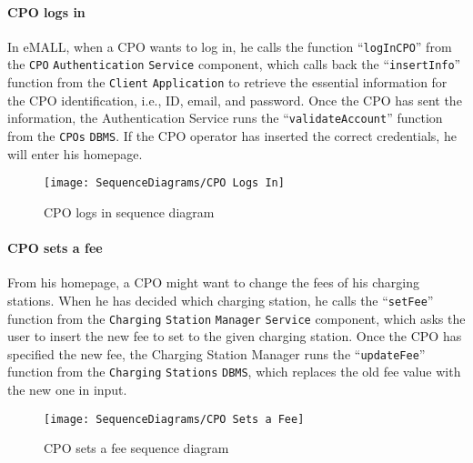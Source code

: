 \paragraph{CPO logs in}
In eMALL, when a CPO wants to log in, he calls the function ``\verb|logInCPO|'' from the \verb|CPO| \verb|Authentication| \verb|Service| component, which calls back the ``\verb|insertInfo|'' function from the \verb|Client| \verb|Application| to retrieve the essential information for the CPO identification, i.e., ID, email, and password.
Once the CPO has sent the information, the Authentication Service runs the ``\verb|validateAccount|'' function from the \verb|CPOs| \verb|DBMS|\@.
If the CPO operator has inserted the correct credentials, he will enter his homepage.
\begin{figure}[H]
    \begin{center}
        \texttt{[image: SequenceDiagrams/CPO Logs In]}
        \caption{CPO logs in sequence diagram}
        \label{cpo_logs_in}
    \end{center}
\end{figure}

\paragraph{CPO sets a fee}
From his homepage, a CPO might want to change the fees of his charging stations.
When he has decided which charging station, he calls the ``\verb|setFee|'' function from the \verb|Charging| \verb|Station| \verb|Manager| \verb|Service| component, which asks the user to insert the new fee to set to the given charging station.
Once the CPO has specified the new fee, the Charging Station Manager runs the ``\verb|updateFee|'' function from the \verb|Charging| \verb|Stations| \verb|DBMS|, which replaces the old fee value with the new one in input.
\begin{figure}[H]
    \begin{center}
        \texttt{[image: SequenceDiagrams/CPO Sets a Fee]}
        \caption{CPO sets a fee sequence diagram}
        \label{cpo_sets_fee}
    \end{center}
\end{figure}

